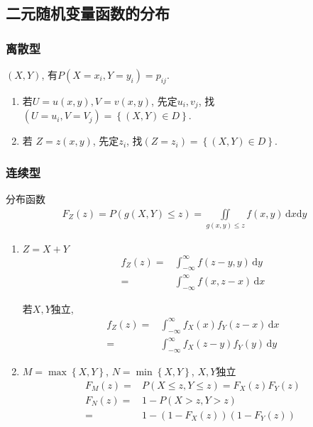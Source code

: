 \subsection{二元随机变量函数的分布}

\subsubsection{离散型}
$(X,Y)$, 有$P(X=x_i,Y=y_i)=p_{ij}$. 
\begin{enumerate}
    \item 若$U=u(x,y), V=v(x,y)$, 先定$u_i,v_j$, 找$(U=u_i,V=V_j)=\left\{(X,Y)\in D\right\}$. 
    \item 若 $Z=z(x,y)$, 先定$z_i$, 找$(Z=z_i)=\left\{(X,Y)\in D\right\}$. 
\end{enumerate}

\subsubsection{连续型}
分布函数
\begin{align*}
    F_Z(z)=P(g(X,Y)\le z)=\underset{g(x,y)\le z}{\iint} f(x,y)\, \mathrm{d}x\mathrm{d}y
\end{align*}
\begin{enumerate}
    \item $Z=X+Y$
    \begin{align*}
        f_Z(z)=&\int_{-\infty}^{\infty}f(z-y,y)\,\mathrm{d}y\\
        =&\int_{-\infty}^{\infty}f(x,z-x)\,\mathrm{d}x
    \end{align*}

    若$X,Y$独立,
    \begin{align*}
        f_Z(z)=&\int_{-\infty}^{\infty}f_X(x)f_Y(z-x)\,\mathrm{d}x\\
        =&\int_{-\infty}^{\infty}f_X(z-y)f_Y(y)\,\mathrm{d}y
    \end{align*}
    \item $M=\max\left\{X,Y\right\}$, $N=\min\left\{X,Y\right\}$, $X,Y$独立
    \begin{align*}
        F_M(z)=&P(X\le z,Y\le z)=F_X(z)F_Y(z)\\
        F_N(z)=&1-P(X>z,Y>z)\\=&1-(1-F_X(z))(1-F_Y(z))
    \end{align*}
\end{enumerate}